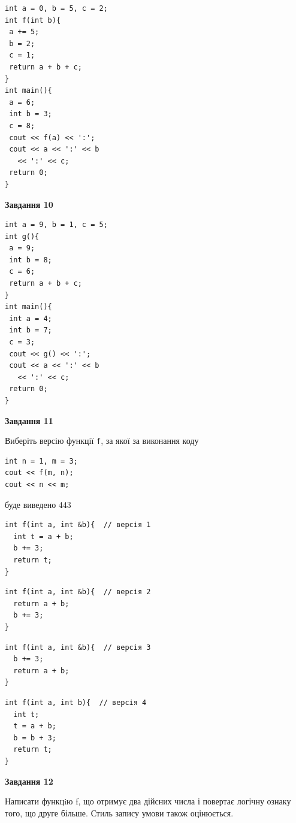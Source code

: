 \documentclass[12pt, ukrainian]{article}
\def\code#1{\Verb!#1!}
\begin{document}
{\begin {large}
\begin{minipage}[t]{7.0cm}
\begin{verbatim}
int a = 0, b = 5, c = 2;
int f(int b){
 a += 5;
 b = 2;
 c = 1;
 return a + b + c;
}
int main(){
 a = 6;
 int b = 3;
 c = 8;
 cout << f(a) << ':';
 cout << a << ':' << b 
   << ':' << c;
 return 0;
}
\end{verbatim}



\begin{center}
\textbf{Завдання 10}
\end{center}
\vspace{-8mm}

\begin{verbatim}
int a = 9, b = 1, c = 5;
int g(){
 a = 9;
 int b = 8;
 c = 6;
 return a + b + c;
}
int main(){
 int a = 4;
 int b = 7;
 c = 3;
 cout << g() << ':';
 cout << a << ':' << b 
   << ':' << c;
 return 0;
}
\end{verbatim}

\end{minipage}
\vline \hspace{1mm}
\begin{minipage}[t]{11.0cm}

\begin{center}
\textbf{Завдання 11}
\end{center}
Виберіть версію функції \code{f}, за якої за виконання коду
\begin{verbatim}
int n = 1, m = 3;
cout << f(m, n);
cout << n << m;
\end{verbatim}

буде виведено 443

\begin{verbatim}
int f(int a, int &b){  // версія 1
  int t = a + b;
  b += 3;
  return t;
}
\end{verbatim}

\vspace{-8mm}\begin{verbatim}
int f(int a, int &b){  // версія 2
  return a + b;
  b += 3;
}
\end{verbatim}

\vspace{-8mm}\begin{verbatim}
int f(int a, int &b){  // версія 3
  b += 3;
  return a + b;
}
\end{verbatim}

\vspace{-8mm}\begin{verbatim}
int f(int a, int b){  // версія 4
  int t;
  t = a + b;
  b = b + 3;
  return t;
}
\end{verbatim}



\begin{center}
\textbf{Завдання 12}
\end{center}

Написати функцiю f, що отримує два дійсних числа і повертає логічну ознаку того, що друге більше. Стиль запису умови також оцінюється.\par

\end{minipage}

\end {large}}
\newpage
\end{document}
